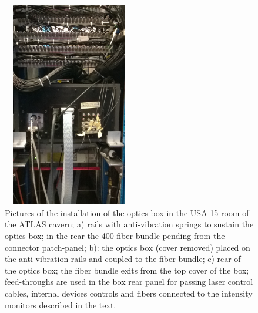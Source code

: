 \begin{figure}[htb]
\begin{center}
\includegraphics[width=5.8cm, height=9cm]{figures/WP_20141010_12_11_55_Pro}
\caption{Pictures of the installation of the optics box in the USA-15 room of the
ATLAS cavern; a) rails with anti-vibration springs to sustain the optics box; in the
rear the 400 fiber bundle pending from the connector patch-panel; b): the optics box
(cover removed) placed on the anti-vibration rails and coupled to the fiber bundle;
c) rear of the optics box; the fiber bundle exits from the top cover of the box;
feed-throughs are used in the box rear panel for passing laser control cables,
internal devices controls and fibers connected to the intensity monitors described
in the text.  
}\label{fig:x.1}
\end{center}
\end{figure}
%

